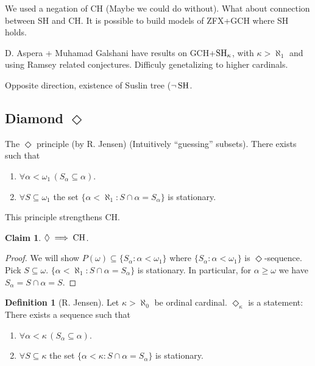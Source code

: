 \documentclass[11pt,pdftex,twoside,a4paper]{article}
\newcommand{\CH}{\ensuremath{\mathop{\rm CH}\nolimits}}
\newcommand{\SH}{\ensuremath{\mathop{\rm SH}\nolimits}}
\newtheorem{claim}[thm]{Claim}
\theoremstyle{definition}
\newtheorem{ldef}[thm]{Definition}
\begin{document}
{We used a negation of CH (Maybe we could do without).
What about connection between SH and CH.
It is possible to build models of ZFX+GCH where SH holds.

D. Aspera + Muhamad Galshani 
have results on GCH+\(\SH_{\kappa}\), with  \(\kappa > \aleph_1\)
and using Ramsey related conjectures.
Difficuly genetalizing to higher cardinals.

Opposite direction, existence of Suslin tree (\(\lnot\SH\).

\subsection{Diamond \(\Diamond\)}

The \(\Diamond\) principle (by R. Jensen)
(Intuitively ``guessing'' subsets).
There exists  such that 
\begin{enumerate}
\item \(\forall \alpha<\omega_1\, (S_\alpha \subseteq \alpha)\).
\item \(\forall S\subseteq \omega_1\) the set
  \(\{\alpha < \aleph_1: S\cap \alpha = S_\alpha\}\) is stationary.
\end{enumerate}
This principle strengthens CH.

\begin{claim}
\(\Diamond \implies \CH\).
\end{claim}
\begin{proof}
We will show \(P(\omega)\subseteq \{S_\alpha: \alpha<\omega_1\}\)
where \(\{S_\alpha: \alpha<\omega_1\}\) is \(\Diamond\)-sequence.
Pick \(S \subseteq \omega\).
\(\{\alpha < \aleph_1: S\cap \alpha = S_\alpha\}\) is stationary.
In particular, for \(\alpha \geq \omega\) 
we have \(S_\alpha = S \cap \alpha = S\).
\end{proof}

\begin{ldef}[R. Jensen]
Let \(\kappa > \aleph_0\) be ordinal cardinal. 
\(\Diamond_\kappa\) is a statement:
There exists a sequence  such that
\begin{enumerate}
\item \(\forall \alpha < \kappa\, (S_\alpha \subseteq \alpha)\).
\item \(\forall S \subseteq \kappa\)
  the set
  \(\{\alpha < \kappa: S \cap \alpha = S_\alpha\}\) is stationary.
\end{enumerate}
\end{ldef}

}
\end{document}
